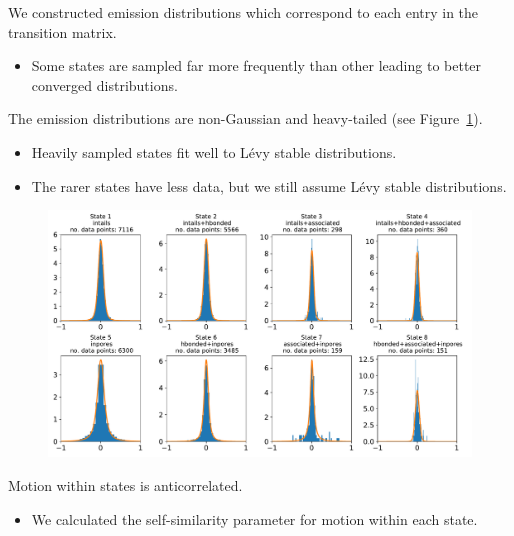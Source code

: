 \documentclass{article}
\begin{document}
  We constructed emission distributions which correspond to each entry in the transition
  matrix.
  \begin{itemize}
    \item Some states are sampled far more frequently than other leading to better converged
    distributions.
  \end{itemize}
  
  The emission distributions are non-Gaussian and heavy-tailed (see Figure~\ref{fig:emissions_MET}).
  \begin{itemize}
    \item Heavily sampled states fit well to L\'evy stable distributions.
    \item The rarer states have less data, but we still assume L\'evy stable distributions.
  \end{itemize}
  
  \begin{figure}[!h]
  \includegraphics[width=\textwidth]{emissions_MET.pdf}
  \caption{}\label{fig:emissions_MET}
  \end{figure}
  
  \noindent Motion within states is anticorrelated. 
  \begin{itemize}
    \item We calculated the self-similarity parameter for motion within each state.
  \end{itemize}
  
\end{document}
